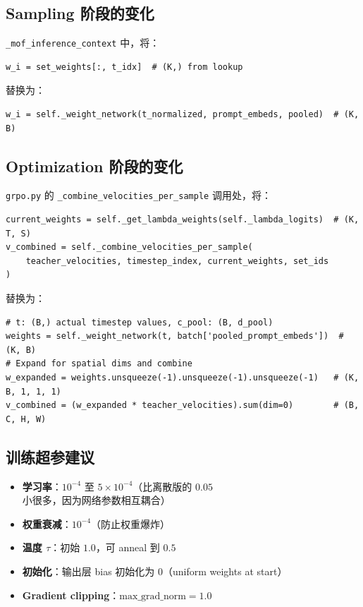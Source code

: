 \documentclass[11pt,a4paper]{article}
\theoremstyle{definition}
\begin{document}
\subsection{Sampling 阶段的变化}

\texttt{\_mof\_inference\_context} 中，将：
\begin{verbatim}
w_i = set_weights[:, t_idx]  # (K,) from lookup
\end{verbatim}
替换为：
\begin{verbatim}
w_i = self._weight_network(t_normalized, prompt_embeds, pooled)  # (K, B)
\end{verbatim}

\subsection{Optimization 阶段的变化}

\texttt{grpo.py} 的 \texttt{\_combine\_velocities\_per\_sample} 调用处，将：
\begin{verbatim}
current_weights = self._get_lambda_weights(self._lambda_logits)  # (K, T, S)
v_combined = self._combine_velocities_per_sample(
    teacher_velocities, timestep_index, current_weights, set_ids
)
\end{verbatim}
替换为：
\begin{verbatim}
# t: (B,) actual timestep values, c_pool: (B, d_pool)
weights = self._weight_network(t, batch['pooled_prompt_embeds'])  # (K, B)
# Expand for spatial dims and combine
w_expanded = weights.unsqueeze(-1).unsqueeze(-1).unsqueeze(-1)   # (K, B, 1, 1, 1)
v_combined = (w_expanded * teacher_velocities).sum(dim=0)        # (B, C, H, W)
\end{verbatim}

\subsection{训练超参建议}

\begin{itemize}
    \item \textbf{学习率}：$10^{-4}$ 至 $5 \times 10^{-4}$（比离散版的 $0.05$ 小很多，因为网络参数相互耦合）
    \item \textbf{权重衰减}：$10^{-4}$（防止权重爆炸）
    \item \textbf{温度 $\tau$}：初始 $1.0$，可 anneal 到 $0.5$
    \item \textbf{初始化}：输出层 bias 初始化为 $0$（uniform weights at start）
    \item \textbf{Gradient clipping}：$\text{max\_grad\_norm} = 1.0$
\end{itemize}
\end{document}
